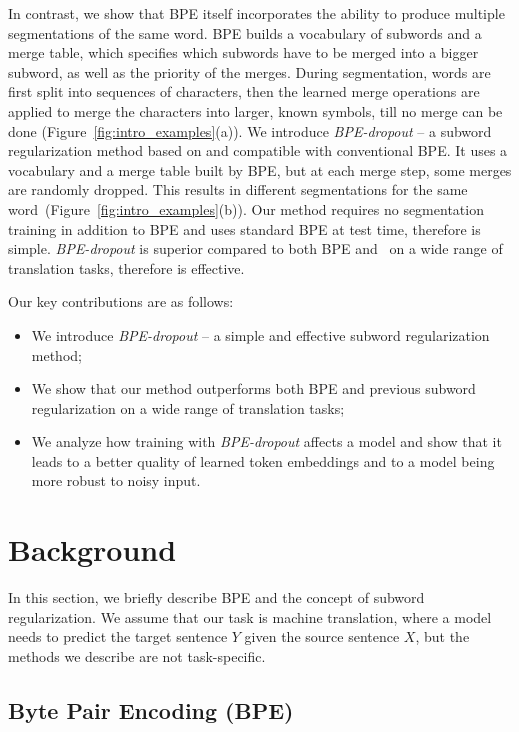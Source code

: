 \documentclass[11pt,a4paper]{article}
\begin{document}
In contrast, we show that BPE itself incorporates the ability to produce multiple segmentations of the same word. BPE builds a vocabulary of subwords and a merge table, which specifies which subwords have to be merged into a bigger subword, as well as the priority of the merges. During segmentation, words are first split into sequences of characters, then the learned merge operations are applied to merge the characters into larger, known symbols, till no merge can be done (Figure~\ref{fig:intro_examples}(a)). We introduce \textit{BPE-dropout} -- a subword regularization method based on and compatible with conventional BPE. It uses a vocabulary and a merge table built by BPE, but at each merge step, some merges are randomly dropped. This results in different segmentations for the same word~(Figure~\ref{fig:intro_examples}(b)). 
Our method requires no segmentation training in addition to BPE and uses standard BPE at test time, therefore is simple. \textit{BPE-dropout} is superior compared to both BPE and~\citet{sentencepiece} on a wide range of translation tasks, therefore is effective.

Our key contributions are as follows:
\begin{itemize}
    \item We introduce \textit{BPE-dropout} -- a simple and effective subword regularization method;
    \item We show that our method outperforms both BPE and previous subword regularization on a wide range of translation tasks;
    \item We analyze how training with \textit{BPE-dropout}  affects a model and show that it leads to a better quality of learned token embeddings and to a model being more robust to noisy input.
\end{itemize}


 
\section{Background}




In this section, we briefly describe BPE and the concept of subword regularization.
We assume that our task is machine translation, where a model needs to predict the target sentence $Y$ given the source sentence $X$, but the methods we describe are not task-specific.


\subsection{Byte Pair Encoding (BPE)}\label{sec:bpe}
\end{document}
